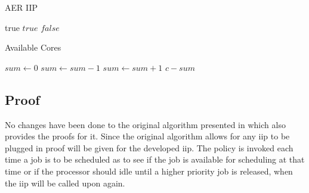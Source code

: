 \documentclass{kththesis}
\begin{document}
\begin{algorithm}
    \caption{AER IIP}
    \label{algo:aer_iip}
    \begin{algorithmic}[1]
                \State \Return true
            \Else
                    \State \Return $true$
                \Else
                    \State \Return $false$
                \EndIf
            \EndIf
        \EndFunction
    \end{algorithmic}
\end{algorithm}

\begin{algorithm}
    \caption{Available Cores}
    \label{algo:available_cores}
    \begin{algorithmic}[1]
            \State $sum\gets 0$
                    \State $sum\gets sum-1$
                    \State $sum\gets sum+1$
                \EndIf
            \EndFor
            \State \Return $c - sum$
        \EndFunction
    \end{algorithmic}
\end{algorithm}


\subsection{Proof}

No changes have been done to the original algorithm presented in \parencite{nasri_exact_2017} which
also provides the proofs for it. Since the original algorithm allows for any \acrshort{iip} to be
plugged in proof will be given for the developed \acrshort{iip}. The policy is invoked each time a
job is to be scheduled as to see if the job is available for scheduling at that time or if the
processor should idle until a higher priority job is released, when the \acrshort{iip} will be
called upon again.

%
%
\end{document}
